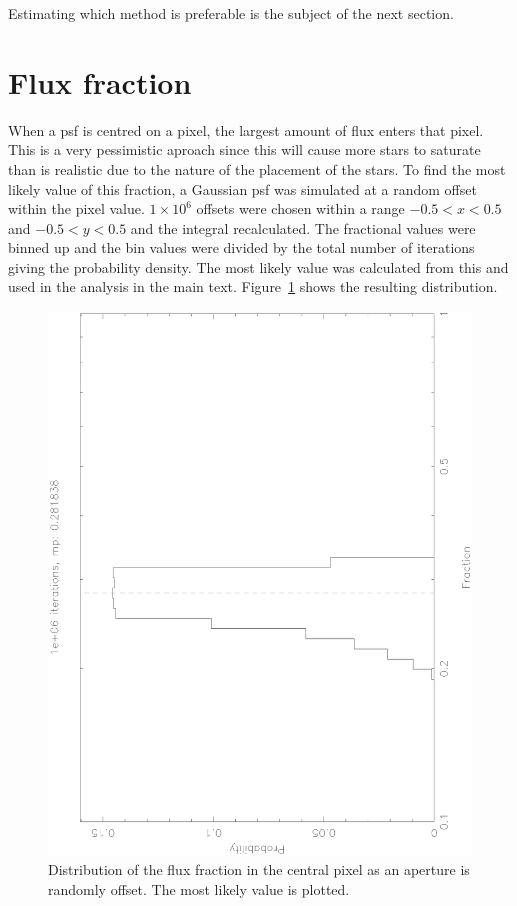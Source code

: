 \documentclass[11pt,a4paper]{report}
\begin{document}
Estimating which method is preferable is the subject of the next
section.



\section{Flux fraction}
\label{sec:ffraction}

When a psf is centred on a pixel, the largest amount of flux enters that
pixel. This is a very pessimistic aproach since this will cause more
stars to saturate than is realistic due to the nature of the placement
of the stars. To find the most likely value of this fraction, a Gaussian
psf was simulated at a random offset within the pixel value.
$1\times10^6$ offsets were chosen within a range $-0.5 < x < 0.5$ and
$-0.5 < y < 0.5$ and the integral recalculated. The fractional values
were binned up and the bin values were divided by the total number of
iterations giving the probability density. The most likely value was
calculated from this and used in the analysis in the main text.
Figure~\ref{fig:fractiondistribution} shows the resulting distribution.

\begin{figure}[h]
    \begin{center}
        \includegraphics[angle=270,width=0.9\columnwidth]{images/fractiondistribution}
    \end{center}
    \caption{Distribution of the flux fraction in the central pixel as
    an aperture is randomly offset. The most likely value is plotted.}
    \label{fig:fractiondistribution}
\end{figure}
\end{document}
